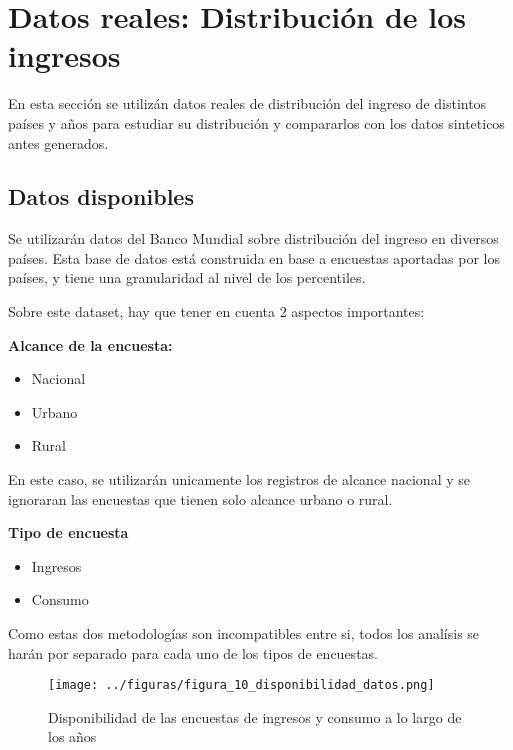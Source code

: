 \chapter{Datos reales: Distribución de los ingresos} \label{chapter:datos_reales_distribucion}

En esta sección se utilizán datos reales de distribución del ingreso de distintos países y años para estudiar su distribución y compararlos con los datos sinteticos antes generados.

\section{Datos disponibles}

Se utilizarán datos del Banco Mundial \cite{income_distribution_dataset} sobre distribución del ingreso en diversos países. Esta base de datos está construida en base a encuestas aportadas por los países, y tiene una granularidad al nivel de los percentiles.
    
Sobre este dataset, hay que tener en cuenta 2 aspectos importantes:

\textbf{Alcance de la encuesta:}

\begin{itemize}
    \item Nacional
    \item Urbano
    \item Rural
\end{itemize}

En este caso, se utilizarán unicamente los registros de alcance nacional y se ignoraran las encuestas que tienen solo alcance urbano o rural.

\textbf{Tipo de encuesta}

\begin{itemize}
    \item Ingresos
    \item Consumo
\end{itemize}

Como estas dos metodologías son incompatibles entre si, todos los analísis se harán por separado para cada uno de los tipos de encuestas.

\begin{figure}[H] %
    \centering %
    \texttt{[image: ../figuras/figura\_10\_disponibilidad\_datos.png]} %
    \caption{Disponibilidad de las encuestas de ingresos y consumo a lo largo de los años}
    \label{fig:10} %
\end{figure}

